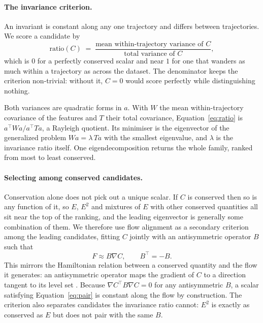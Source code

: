 \paragraph{The invariance criterion.} An invariant is constant along any one trajectory and differs
between trajectories. We score a candidate by
\begin{equation}
\text{ratio}(C) \;=\;
\frac{\text{mean within-trajectory variance of } C}{\text{total variance of } C},
\label{eq:ratio}
\end{equation}
which is $0$ for a perfectly conserved scalar and near $1$ for one that wanders as much within a
trajectory as across the dataset. The denominator keeps the criterion non-trivial: without it,
$C = 0$ would score perfectly while distinguishing nothing.

Both variances are quadratic forms in $a$. With $W$ the mean within-trajectory covariance of the
features and $T$ their total covariance, Equation~\ref{eq:ratio} is $a^\top W a / a^\top T a$, a
Rayleigh quotient. Its minimiser is the eigenvector of the generalized problem
$W a = \lambda\, T a$ with the smallest eigenvalue, and $\lambda$ is the invariance ratio itself. One
eigendecomposition returns the whole family, ranked from most to least conserved.

\paragraph{Selecting among conserved candidates.} Conservation alone does not pick out a unique
scalar. If $C$ is conserved then so is any function of it, so $E$, $E^2$ and mixtures of $E$ with
other conserved quantities all sit near the top of the ranking, and the leading eigenvector is
generally some combination of them. We therefore use flow alignment as a secondary criterion among
the leading candidates, fitting $C$ jointly with an antisymmetric operator $B$ such that
\begin{equation}
F \approx B\nabla C, \qquad B^\top = -B.
\label{eq:pair}
\end{equation}
This mirrors the Hamiltonian relation between a conserved quantity and the flow it generates: an
antisymmetric operator maps the gradient of $C$ to a direction tangent to its level set
\citep{arnold1989mathematical}. Because $\nabla C^\top B \nabla C = 0$ for any antisymmetric $B$, a
scalar satisfying Equation~\ref{eq:pair} is constant along the flow by construction. The criterion
also separates candidates the invariance ratio cannot: $E^2$ is exactly as conserved as $E$ but does
not pair with the same $B$.

